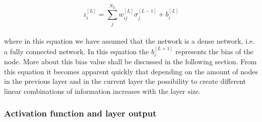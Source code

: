 \documentclass[12pt]{article}
\begin{document}
\begin{equation} \label{cache}
z^{[L]}_{i} = \sum_{j}^{N_{L}} w_{ij}^{[L]}\sigma_{j}^{[L-1]} + b_{i}^{[L]}
\end{equation}
\\
where in this equation we have assumed that the network is a dense network, i.e. a fully connected network. In this equation the $b_{i}^{[L+1]}$ represents the bias of the node. More about this bias value shall be discussed in the following section.  From this equation it becomes apparent quickly that depending on the amount of nodes in the previous layer and in the current layer the possibility to create different linear combinations of information increases with the layer size.

\subsubsection{Activation function and layer output}
\end{document}
